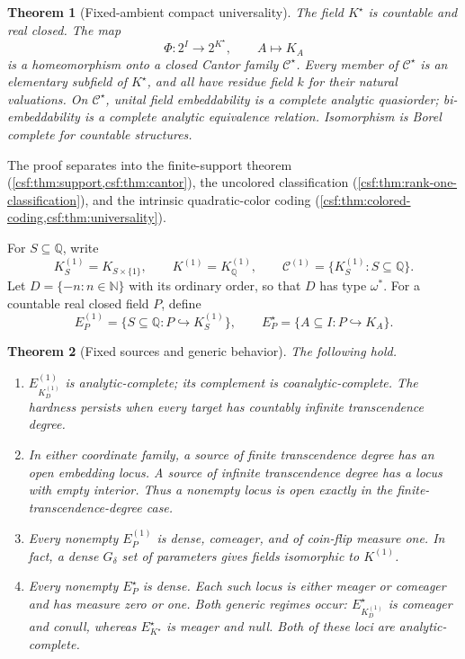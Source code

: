 \documentclass[11pt,a4paper]{article}
\numberwithin{equation}{section}
\newtheorem{theorem}{Theorem}[section]
\theoremstyle{definition}
\theoremstyle{remark}
\newcommand{\N}{\mathbb N}
\newcommand{\Q}{\mathbb Q}
\newcommand{\emb}{\hookrightarrow}
\newcommand{\Cstar}{\mathcal C^{\star}}
\newcommand{\Cone}{\mathcal C^{(1)}}
\newcommand{\Kstar}{K^{\star}}
\newcommand{\Kone}{K^{(1)}}
\begin{document}
\begin{theorem}[Fixed-ambient compact universality]
\label{csf:thm:main}
The field $\Kstar$ is countable and real closed. The map
\[
 \Phi:2^I\longrightarrow 2^{\Kstar},\qquad A\longmapsto K_A
\]
is a homeomorphism onto a closed Cantor family $\Cstar$. Every member of
$\Cstar$ is an elementary subfield of $\Kstar$, and all have residue field
$k$ for their natural valuations. On $\Cstar$, unital field embeddability is
a complete analytic quasiorder; bi-embeddability is a complete analytic
equivalence relation. Isomorphism is Borel complete for countable structures.
\end{theorem}

The proof separates into the finite-support theorem
(\cref{csf:thm:support,csf:thm:cantor}), the uncolored classification
(\cref{csf:thm:rank-one-classification}), and the intrinsic quadratic-color coding
(\cref{csf:thm:colored-coding,csf:thm:universality}).

For $S\subseteq\Q$, write
\[
 \Kone_S=K_{S\times\{1\}},\qquad \Kone=\Kone_{\Q},
 \qquad \Cone=\{\Kone_S:S\subseteq\Q\}.
\]
Let $D=\{-n:n\in\N\}$ with its ordinary order, so that $D$ has type
$\omega^*$. For a countable real closed field $P$, define
\[
 E^{(1)}_P=\{S\subseteq\Q:P\emb\Kone_S\},\qquad
 E^\star_P=\{A\subseteq I:P\emb K_A\}.
\]

\begin{theorem}[Fixed sources and generic behavior]
\label{csf:thm:main-source}
The following hold.
\begin{enumerate}[label=\textnormal{(\roman*)}]
\item $E^{(1)}_{\Kone_D}$ is analytic-complete; its complement is
coanalytic-complete. The hardness persists when every target has countably
infinite transcendence degree.
\item In either coordinate family, a source of finite transcendence degree
has an open embedding locus. A source of infinite transcendence degree has
a locus with empty interior. Thus a nonempty locus is open exactly in the
finite-transcendence-degree case.
\item Every nonempty $E^{(1)}_P$ is dense, comeager, and of coin-flip measure
one. In fact, a dense $G_\delta$ set of parameters gives fields isomorphic to
$\Kone$.
\item Every nonempty $E^\star_P$ is dense. Each such locus is either meager
or comeager and has measure zero or one. Both generic regimes occur:
$E^\star_{\Kone_D}$ is comeager and conull, whereas
$E^\star_{\Kstar}$ is meager and null. Both of these loci are
analytic-complete.
\end{enumerate}
\end{theorem}
\end{document}
